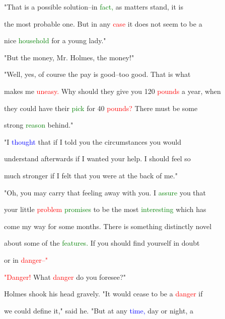  "That is a possible solution--in \textcolor{green}{fact,} as matters stand, it is

 the most probable one. But in any \textcolor{red}{case} it does not seem to be a

 nice \textcolor{green}{household} for a \textcolor{BurntOrange}{young} lady."



 "But the \textcolor{BurntOrange}{money,} Mr. Holmes, the \textcolor{BurntOrange}{money!"}



 "Well, yes, of course the \textcolor{BurntOrange}{pay} is good--too \textcolor{BurntOrange}{good.} That is what

 makes me \textcolor{red}{uneasy.} Why should they give you 120 \textcolor{red}{pounds} a year, when

 they could have their \textcolor{green}{pick} for 40 \textcolor{red}{pounds?} There must be some

 strong \textcolor{green}{reason} behind."



 "I \textcolor{blue}{thought} that if I told you the circumstances you would

 understand afterwards if I wanted your help. I should feel so

 much stronger if I felt that you were at the back of me."



 "Oh, you may carry that feeling away with you. I \textcolor{green}{assure} you that

 your little \textcolor{red}{problem} \textcolor{green}{promises} to be the most \textcolor{green}{interesting} which has

 come my way for some months. There is something distinctly novel

 about some of the \textcolor{green}{features.} If you should find yourself in \textcolor{BurntOrange}{doubt}

 or in \textcolor{red}{danger--"}



 \textcolor{red}{"Danger!} What \textcolor{red}{danger} do you \textcolor{BurntOrange}{foresee?"}



 Holmes shook his head gravely. "It would cease to be a \textcolor{red}{danger} if

 we could define it," said he. "But at any \textcolor{blue}{time,} day or night, a

